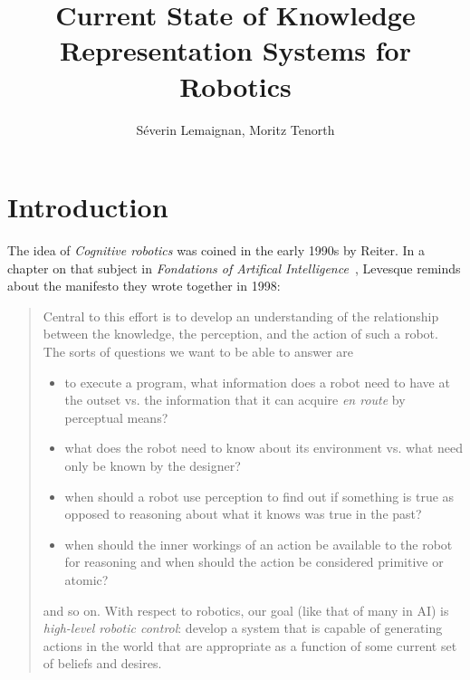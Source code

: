 \documentclass[a4paper]{article}
\title{Current State of Knowledge Representation Systems for Robotics}
\author{Séverin Lemaignan, Moritz Tenorth}
\begin{document}
\maketitle
\tableofcontents

\section{Introduction}
\label{sect|intro}

The idea of \emph{Cognitive robotics} was coined in the early 1990s by Reiter.
In a chapter on that subject in \emph{Fondations of Artifical
Intelligence}~\cite{Levesque2007}, Levesque reminds about the manifesto they
wrote together in 1998:

\begin{quotation}

	Central to this effort is to develop an understanding of the relationship
	between the knowledge, the perception, and the action of such a robot. The
	sorts of questions we want to be able to answer are

	\begin{itemize} 
	
		\item to execute a program, what information does a robot need to have
		at the outset vs. the information that it can acquire \emph{en route}
		by perceptual means?

		\item what does the robot need to know about its environment vs. what
		need only be known by the designer?

		\item when should a robot use perception to find out if something is
		true as opposed to reasoning about what it knows was true in the past?

		\item when should the inner workings of an action be available to the
		robot for reasoning and when should the action be considered primitive
		or atomic?

	\end{itemize}

	and so on. With respect to robotics, our goal (like that of many in AI) is
	\emph{high-level robotic control}: develop a system that is capable of
	generating actions in the world that are appropriate as a function of some
	current set of beliefs and desires.

\end{quotation}
\end{document}
